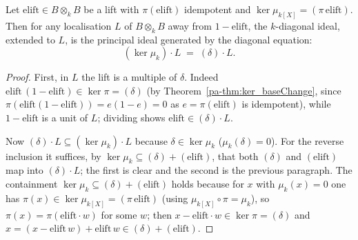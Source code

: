 \begin{theorem}
  \label{pa-thm:ker_map_localization_eq}
  \leanok

  Let \(\mathrm{elift} \in B \otimes_k B\) be a lift with \(\pi(\mathrm{elift})\) idempotent and
  \(\ker \mu_{k[X]} = (\pi\,\mathrm{elift})\). Then for any localisation \(L\) of \(B \otimes_k B\)
  away from \(1 - \mathrm{elift}\), the \(k\)-diagonal ideal, extended to \(L\), is the principal
  ideal generated by the diagonal equation:
  \[
    (\ker \mu_k)\cdot L \;=\; (\delta)\cdot L .
  \]
\end{theorem}
\begin{proof}
  \leanok
  First, in \(L\) the lift is a multiple of \(\delta\). Indeed \(\mathrm{elift}\,(1 -
  \mathrm{elift}) \in \ker \pi = (\delta)\) (by Theorem~\ref{pa-thm:ker_baseChange}, since
  \(\pi(\mathrm{elift}(1-\mathrm{elift})) = e(1-e) = 0\) as \(e = \pi(\mathrm{elift})\) is
  idempotent), while \(1 - \mathrm{elift}\) is a unit of \(L\); dividing shows \(\mathrm{elift} \in
  (\delta)\cdot L\).

  Now \((\delta)\cdot L \subseteq (\ker \mu_k)\cdot L\) because \(\delta \in \ker \mu_k\)
  (\(\mu_k(\delta) = 0\)). For the reverse inclusion it suffices, by \(\ker \mu_k \subseteq
  (\delta) + (\mathrm{elift})\), that both \((\delta)\) and \((\mathrm{elift})\) map into
  \((\delta)\cdot L\); the first is clear and the second is the previous paragraph. The
  containment \(\ker \mu_k \subseteq (\delta) + (\mathrm{elift})\) holds because for \(x\) with
  \(\mu_k(x) = 0\) one has \(\pi(x) \in \ker \mu_{k[X]} = (\pi\,\mathrm{elift})\) (using
  \(\mu_{k[X]} \circ \pi = \mu_k\)), so \(\pi(x) = \pi(\mathrm{elift}\cdot w)\) for some \(w\);
  then \(x - \mathrm{elift}\cdot w \in \ker \pi = (\delta)\) and \(x = (x - \mathrm{elift}\,w) +
  \mathrm{elift}\,w \in (\delta) + (\mathrm{elift})\).
\end{proof}

